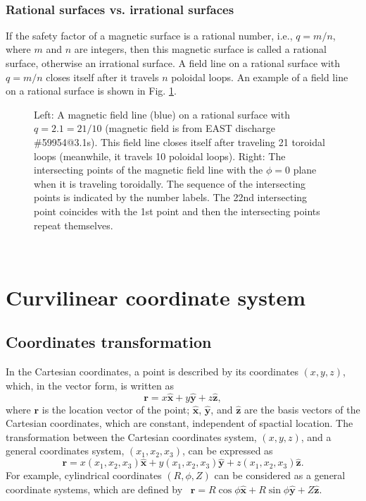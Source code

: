 \documentclass{llncs}
\begin{document}
\

\subsubsection{Rational surfaces vs. irrational surfaces}

If the safety factor of a magnetic surface is a rational number, i.e., $q = m
/ n$, where $m$ and $n$ are integers, then this magnetic surface is called a
rational surface, otherwise an irrational surface. A field line on a rational
surface with $q = m / n$ closes itself after it travels $n$ poloidal loops. An
example of a field line on a rational surface is shown in Fig. \ref{17-1-1-1}.

\begin{figure}[h]
  \caption{\label{17-1-1-1}Left: A magnetic field line (blue) on a rational
  surface with $q = 2.1 = 21 / 10$ (magnetic field is from EAST discharge
  \#59954@3.1s). This field line closes itself after traveling 21 toroidal
  loops (meanwhile, it travels 10 poloidal loops). Right: The intersecting
  points of the magnetic field line with the $\phi = 0$ plane when it is
  traveling toroidally. The sequence of the intersecting points is indicated
  by the number labels. The 22nd intersecting point coincides with the 1st
  point and then the intersecting points repeat themselves.}
\end{figure}

\

\section{Curvilinear coordinate system}

\subsection{Coordinates transformation}

In the Cartesian coordinates, a point is described by its coordinates $(x, y,
z)$, which, in the vector form, is written as
\begin{equation}
  \mathbf{r}= x \hat{\mathbf{x}} + y \hat{\mathbf{y}} + z \hat{\mathbf{z}},
\end{equation}
where $\mathbf{r}$ is the location vector of the point; $\hat{\mathbf{x}}$,
$\hat{\mathbf{y}}$, and $\hat{\mathbf{z}}$ are the basis vectors of the
Cartesian coordinates, which are constant, independent of spactial location.
The transformation between the Cartesian coordinates system, $(x, y, z)$, and
a general coordinates system, $(x_1, x_2, x_3)$, can be expressed as
\begin{equation}
  \label{11-8-10dd} \mathbf{r}= x (x_1, x_2, x_3) \hat{\mathbf{x}} + y (x_1,
  x_2, x_3) \hat{\mathbf{y}} + z (x_1, x_2, x_3) \hat{\mathbf{z}} .
\end{equation}
For example, cylindrical coordinates $(R, \phi, Z)$ can be considered as a
general coordinate systems, which are defined by \ $\mathbf{r}= R \cos \phi
\hat{\mathbf{x}} + R \sin \phi \hat{\mathbf{y}} + Z \hat{\mathbf{z}}$.
\end{document}
